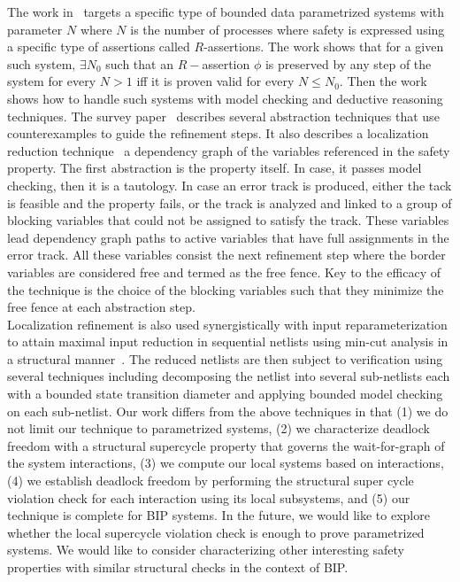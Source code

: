 The work in~\cite{PnueliRZ01TACAS} targets a specific type of bounded data 
parametrized systems with parameter $N$ where $N$ is the number of processes
where safety is expressed using a specific type of assertions called $R$-assertions.
The work shows that for a given such system, $\exists N_0$ such that an
$R-$assertion $\phi$ is preserved by any step of the system for every $N>1$
iff it is proven valid for every $N\le N_0$. 
Then the work shows how to handle such systems with model checking and deductive
reasoning techniques. 
% 
The survey paper~\cite{ClarkeKV10Memory} describes several abstraction 
techniques that use counterexamples to guide the refinement steps. 
It also describes a localization reduction technique~\cite{Kurshan94} 
a dependency graph of the variables referenced in the safety property. 
The first abstraction is the property itself. 
In case, it passes model checking, then it is a tautology. 
In case an error track is produced, either the tack is feasible and the property
fails, or the track is analyzed and linked to 
a group of blocking variables that could not be assigned to satisfy the track. 
These variables lead dependency graph paths to active variables that have full 
assignments in the error track. 
All these variables consist the next refinement step where the border variables
are considered free and termed as the free fence. 
Key to the efficacy of the technique is the choice of the blocking variables
such that they minimize the free fence at each abstraction step. \\
Localization refinement is also used synergistically with input 
reparameterization to attain maximal input reduction in 
sequential netlists using min-cut analysis 
in a structural manner~\cite{BaumgartnerM05Charme}. 
The reduced netlists are then subject to verification using several 
techniques including decomposing the netlist into several sub-netlists each 
with a bounded state transition diameter and applying bounded model checking
~\cite{BaumgartnerK04Date,BaumgartnerKA02CAV} on each sub-netlist. 
%
Our work differs from the above techniques in that 
(1) we do not limit our technique to 
parametrized systems, 
(2) we characterize deadlock freedom with a structural supercycle property
that governs the wait-for-graph of the system interactions, 
(3) we compute our local systems based on interactions, 
(4) we establish deadlock freedom by performing the structural super cycle violation
check for each interaction using its local subsystems,  and
(5) our technique is complete for BIP systems. 
In the future, we would like to explore whether the local supercycle violation check
is enough to prove parametrized systems. 
We would like to consider characterizing other interesting safety properties with
similar structural checks in the context of BIP. 


